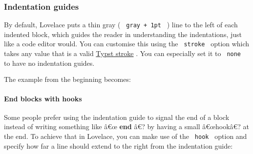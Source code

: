 \subsubsection{Indentation guides}\label{indentation-guides}

By default, Lovelace puts a thin gray ( \texttt{\ gray\ +\ 1pt\ } ) line
to the left of each indented block, which guides the reader in
understanding the indentations, just like a code editor would. You can
customise this using the \texttt{\ stroke\ } option which takes any
value that is a valid
\href{https://typst.app/docs/reference/visualize/stroke/}{Typst stroke}
. You can especially set it to \texttt{\ none\ } to have no indentation
guides.

The example from the beginning becomes:

\begin{Shaded}
\begin{Highlighting}[]
\NormalTok{\#pseudocode{-}list(stroke: none)[}
\NormalTok{]}
\end{Highlighting}
\end{Shaded}

\pandocbounded{}

\paragraph{End blocks with hooks}\label{end-blocks-with-hooks}

Some people prefer using the indentation guide to signal the end of a
block instead of writing something like â€œ \textbf{end} â€? by having a
small â€œhookâ€? at the end. To achieve that in Lovelace, you can make
use of the \texttt{\ hook\ } option and specify how far a line should
extend to the right from the indentation guide:

\begin{Shaded}
\begin{Highlighting}[]
\NormalTok{\#pseudocode{-}list(hooks: .5em)[}
\NormalTok{]}
\end{Highlighting}
\end{Shaded}

